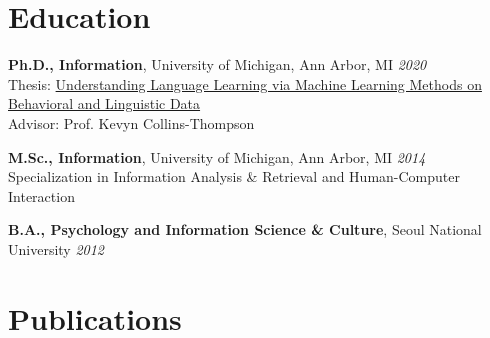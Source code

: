 \documentclass[11pt,a4paper]{article}
\begin{document}
\section*{Education}

\textbf{Ph.D., Information}, University of Michigan, Ann Arbor, MI \hfill \textit{2020} \\
Thesis: \href{https://deepblue.lib.umich.edu/bitstreams/53077431-bd06-4137-a7e9-f757bb7cfa28/download}{Understanding Language Learning via Machine Learning Methods on Behavioral and Linguistic Data} \\
Advisor: Prof. Kevyn Collins-Thompson

\textbf{M.Sc., Information}, University of Michigan, Ann Arbor, MI \hfill \textit{2014} \\
Specialization in Information Analysis \& Retrieval and Human-Computer Interaction

\textbf{B.A., Psychology and Information Science \& Culture}, Seoul National University \hfill \textit{2012}

\section*{Publications}
\end{document}
